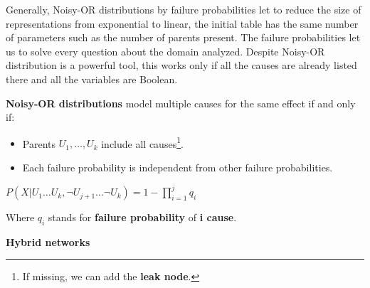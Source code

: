 Generally, Noisy-OR distributions by failure probabilities let to reduce the size of representations from exponential to linear, the initial table has the same number of 
parameters such as the number of parents present. The failure probabilities let us to solve every question about the domain analyzed.
Despite Noisy-OR distribution is a powerful tool, this works only if all the causes are already listed there and all the variables
are Boolean.
\begin{definition}
    \textbf{Noisy-OR distributions} model multiple causes for the same effect if and only if:
    \begin{itemize}
        \renewcommand{\labelitemi}{-}
        \item Parents $U_1, \dots, U_k$ include all causes\footnote{If missing, we can add the \textbf{leak node}.}.
        \item Each failure probability is independent from other failure probabilities.
    \end{itemize} \vspace{7pt}

    \begin{center}
        $P(X|U_1 \dots U_k, \neg U_{j+1} \dots \neg U_k) = 1 - \prod_{i=1}^{j} q_i$
    \end{center} \vspace{3.5pt}

    Where $q_i$ stands for \textbf{failure probability} of \textbf{i cause}.
\end{definition}
\textbf{Hybrid networks} \vspace{3.5pt}

